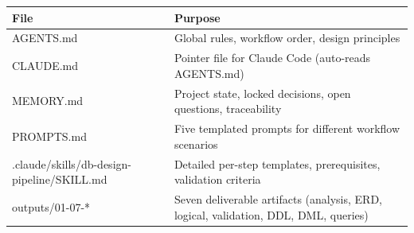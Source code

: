\documentclass[12pt,a4paper]{article}
\begin{document}
\begin{table}[h]
\centering
\begin{tabular}{|l|p{6cm}|}
\hline
\textbf{File} & \textbf{Purpose} \\
\hline
AGENTS.md & Global rules, workflow order, design principles \\
\hline
CLAUDE.md & Pointer file for Claude Code (auto-reads AGENTS.md) \\
\hline
MEMORY.md & Project state, locked decisions, open questions, traceability \\
\hline
PROMPTS.md & Five templated prompts for different workflow scenarios \\
\hline
.claude/skills/db-design-pipeline/SKILL.md & Detailed per-step templates, prerequisites, validation criteria \\
\hline
outputs/01-07-* & Seven deliverable artifacts (analysis, ERD, logical, validation, DDL, DML, queries) \\
\hline
\end{tabular}
\end{table}
\end{document}
